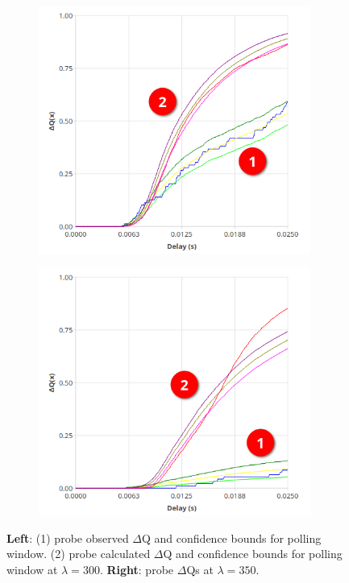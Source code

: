     \begin{figure}[H]
            \centering
            \begin{subfigure}{.5\textwidth}
                \centering
                \includegraphics[width=0.98\textwidth]{img/overload_2/300_probe2.png}
                \label{fig:high_load_1}
            \end{subfigure}%
            \begin{subfigure}{.5\textwidth}
                \centering
                \includegraphics[width =0.98\textwidth]{img/overload_2/350_probe2.png}
                \label{fig:high_load_2}
            \end{subfigure}
            \caption{\textbf{Left}: (1) probe observed $\Delta$Q and confidence bounds for polling window. (2) probe calculated $\Delta$Q and confidence bounds for polling window at $\lambda = 300$. \textbf{Right}: probe $\Delta$Qs at $\lambda = 350$.}%
            \label{fig:hi_lo}%
        \end{figure}
